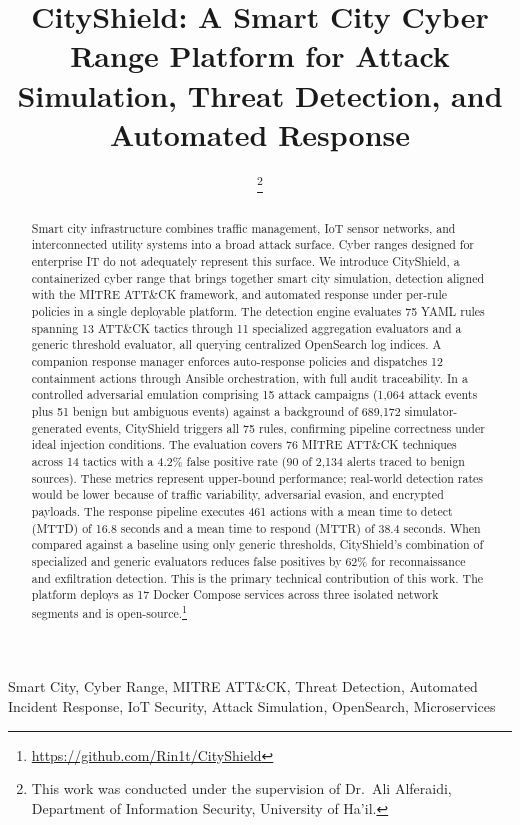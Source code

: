\documentclass[conference,10pt]{IEEEtran}
\title{CityShield: A Smart City Cyber Range Platform for Attack Simulation, Threat Detection, and Automated Response}
\author{
\IEEEauthorblockN{Sami Alsulaymi, Bati Albata, Khaled Alshammari, Thamer Alshammari, and Abdulwahab Alfayez}
\IEEEauthorblockA{
Department of Information Security\\
University of Ha'il\\
Ha'il, Saudi Arabia
}
\thanks{This work was conducted under the supervision of Dr.\ Ali Alferaidi, Department of Information Security, University of Ha'il.}
}
\begin{document}
\maketitle

\begin{abstract}
Smart city infrastructure combines traffic management, IoT sensor networks, and interconnected utility systems into a broad attack surface. Cyber ranges designed for enterprise IT do not adequately represent this surface. We introduce CityShield, a containerized cyber range that brings together smart city simulation, detection aligned with the MITRE ATT\&CK framework, and automated response under per-rule policies in a single deployable platform. The detection engine evaluates 75 YAML rules spanning 13 ATT\&CK tactics through 11 specialized aggregation evaluators and a generic threshold evaluator, all querying centralized OpenSearch log indices. A companion response manager enforces auto-response policies and dispatches 12 containment actions through Ansible orchestration, with full audit traceability. In a controlled adversarial emulation comprising 15 attack campaigns (1,064 attack events plus 51 benign but ambiguous events) against a background of 689,172 simulator-generated events, CityShield triggers all 75 rules, confirming pipeline correctness under ideal injection conditions. The evaluation covers 76 MITRE ATT\&CK techniques across 14 tactics with a 4.2\% false positive rate (90 of 2,134 alerts traced to benign sources). These metrics represent upper-bound performance; real-world detection rates would be lower because of traffic variability, adversarial evasion, and encrypted payloads. The response pipeline executes 461 actions with a mean time to detect (MTTD) of 16.8 seconds and a mean time to respond (MTTR) of 38.4 seconds. When compared against a baseline using only generic thresholds, CityShield's combination of specialized and generic evaluators reduces false positives by 62\% for reconnaissance and exfiltration detection. This is the primary technical contribution of this work. The platform deploys as 17 Docker Compose services across three isolated network segments and is open-source.\footnote{\url{https://github.com/Rin1t/CityShield}}
\end{abstract}

\begin{IEEEkeywords}
Smart City, Cyber Range, MITRE ATT\&CK, Threat Detection, Automated Incident Response, IoT Security, Attack Simulation, OpenSearch, Microservices
\end{IEEEkeywords}
\end{document}

